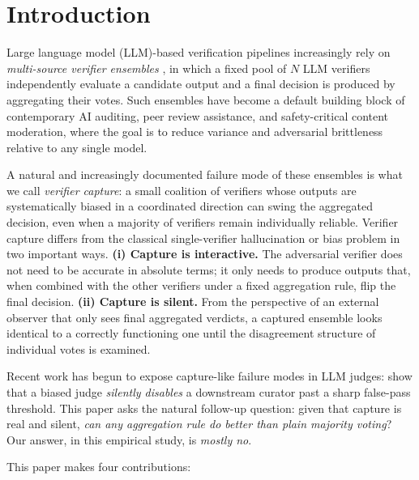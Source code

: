 \documentclass[11pt]{article}
\begin{document}

\section{Introduction}
\label{sec:intro}

Large language model (LLM)-based verification pipelines increasingly rely on
\emph{multi-source verifier ensembles} \citep{cui2026edo,leung2026rubricllm}, in which a fixed pool
of $N$ LLM verifiers independently evaluate a candidate output and a final
decision is produced by aggregating their votes. Such ensembles have become a
default building block of contemporary AI auditing, peer review assistance,
and safety-critical content moderation, where the goal is to reduce variance
and adversarial brittleness relative to any single model.

A natural and increasingly documented failure mode of these ensembles is what
we call \emph{verifier capture}: a small coalition of verifiers whose outputs
are systematically biased in a coordinated direction can swing the aggregated
decision, even when a majority of verifiers remain individually reliable.
Verifier capture differs from the classical single-verifier hallucination or
bias problem in two important ways.
\textbf{(i) Capture is interactive.} The adversarial verifier does not need to
be accurate in absolute terms; it only needs to produce outputs that, when
combined with the other verifiers under a fixed aggregation rule, flip the
final decision.
\textbf{(ii) Capture is silent.} From the perspective of an external observer
that only sees final aggregated verdicts, a captured ensemble looks identical
to a correctly functioning one until the disagreement structure of individual
votes is examined.

Recent work has begun to expose capture-like failure modes in LLM judges:
\citet{zhang2026blindcurator} show that a biased judge \emph{silently
disables} a downstream curator past a sharp false-pass threshold. This paper
asks the natural follow-up question: given that capture is real and silent,
\emph{can any aggregation rule do better than plain majority voting}? Our
answer, in this empirical study, is \emph{mostly no}.

This paper makes four contributions:
\end{document}
